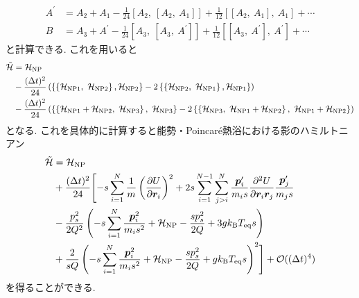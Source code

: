 \begin{align}
  A^{\prime}
  &=
  A_{2} + A_{1}
  -\frac{1}{24}[A_{2},~[A_{2},~A_{1}]] 
  +\frac{1}{12}[[A_{2},~A_{1}],~A_{1}] + \cdots
  \\
  B
  &=
  A_{3} + A^{\prime}
  -\frac{1}{24}[A_{3},~[A_{3},~A^{\prime}]] 
  +\frac{1}{12}[[A_{3},~A^{\prime}],~A^{\prime}] + \cdots
\end{align}
と計算できる. これを用いると
\begin{align}
  \Tilde{\mathcal{H}}
  &=
  \mathcal{H}_\mathrm{NP}
  \notag \\
  &-
  \frac{(\Delta t)^{2}}{24}
  \left(
    \left\{
      \left\{\mathcal{H}_{\mathrm{NP1}},~ \mathcal{H}_{\mathrm{NP2}}\right\},
      \mathcal{H}_{\mathrm{NP2}}
    \right\}
    -2
    \left\{
      \left\{\mathcal{H}_{\mathrm{NP2}},~ \mathcal{H}_{\mathrm{NP1}}\right\},
      \mathcal{H}_{\mathrm{NP1}}
    \right\}
  \right)
  \notag \\
  &-
  \frac{(\Delta t)^{2}}{24}
  \left(
    \left\{
    \left\{
      \mathcal{H}_{\mathrm{NP1}}+\mathcal{H}_{\mathrm{NP2}},~
      \mathcal{H}_{\mathrm{NP3}}
    \right\},~
    \mathcal{H}_{\mathrm{NP3}}
    \right\}
    -2
    \left\{
    \left\{
      \mathcal{H}_{\mathrm{NP3}},~
      \mathcal{H}_{\mathrm{NP1}}+\mathcal{H}_{\mathrm{NP2}}
    \right\},~
    \mathcal{H}_{\mathrm{NP1}}+\mathcal{H}_{\mathrm{NP2}}
    \right\}
  \right)
\end{align}
となる. これを具体的に計算すると能勢・Poincar\'{e}熱浴における影のハミルトニアン
\begin{alignat}{4}
  \Tilde{\mathcal{H}}
  &=
  \mathcal{H}_\mathrm{NP}
  \notag \\
  &+
  \frac{(\Delta t)^{2}}{24}
  \Biggl[
    -s
    \sum_{i=1}^{N}
    \frac{1}{m}
    \left(\frac{\partial U}{\partial \bm{r}_{i}}\right)^{2}
    +
    2s
    \sum_{i=1}^{N-1}\sum_{j>i}^{N}
    \frac{\bm{p}_{i}^{\prime}}{m_{i}s}
    \frac{\partial^{2} U}{\partial \bm{r}_{i} \bm{r}_{j}}
    \frac{\bm{p}_{j}^{\prime}}{m_{j}s}
    \notag \\
    &-
    \frac{p_{s}^{2}}{2Q^{2}}
    \left(
      -s
      \sum_{i=1}^{N}
      \frac{\bm{p}_{i}^{2}}{m_{i}s^{2}}
      +
      \mathcal{H}_{\mathrm{NP}}
      -
      \frac{s p_{s}^{2}}{2Q}
      + 3g k_{\mathrm{B}} T_{\mathrm{eq}} s
    \right)
    \notag \\
    &+
    \frac{2}{sQ}
    \left(
      -s
      \sum_{i=1}^{N}
      \frac{\bm{p}_{i}^{2}}{m_{i}s^{2}}
      +
      \mathcal{H}_{\mathrm{NP}}
      -
      \frac{sp_{s}^{2}}{2Q}
      +
      g k_{\mathrm{B}} T_{\mathrm{eq}} s
    \right)^{2}
  \Biggr]
  +
  \mathcal{O}((\Delta t)^{4})
\end{alignat}
を得ることができる.

